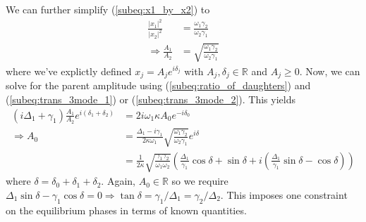We can further simplify (\ref{subeq:x1_by_x2}) to
\begin{subequations}
\begin{align}
\frac{|x_1|^2}{|x_2|^2} & = \frac{\omega_1\gamma_2}{\omega_2\gamma_1} \\
\Rightarrow \frac{A_1}{A_2} & = \sqrt{\frac{\omega_1\gamma_2}{\omega_2\gamma_1}} \label{subeq:ratio_of_daughters}
\end{align}
\end{subequations}
where we've explictly defined $x_j = A_j e^{i\delta_j}$ with $A_j, \delta_j \in \mathbb{R}$ and $A_j \geq 0$. Now, we can solve for the parent amplitude using (\ref{subeq:ratio_of_daughters}) and (\ref{subeq:trans_3mode_1}) or (\ref{subeq:trans_3mode_2}). This yields
\begin{subequations}
\begin{align}
(i\Delta_1+\gamma_1)\frac{A_1}{A_2}e^{i(\delta_1+\delta_2)}  & = 2i\omega_1\kappa A_0 e^{-i\delta_0} \\
\Rightarrow A_0 & = \frac{\Delta_1 - i\gamma_1}{2\kappa\omega_1}\sqrt{\frac{\omega_1\gamma_2}{\omega_2\gamma_1}} e^{i\delta} \\ 
                & = \frac{1}{2\kappa}\sqrt{\frac{\gamma_1\gamma_2}{\omega_1\omega_2}}\left(\frac{\Delta_1}{\gamma_1}\cos{\delta} + \sin{\delta} + i\left(\frac{\Delta_1}{\gamma_1}\sin{\delta} - \cos{\delta}\right)\right)
\end{align}
\end{subequations}
where $\delta = \delta_0 + \delta_1 + \delta_2$. Again, $A_0 \in \mathbb{R}$ so we require $\Delta_1\sin{\delta} - \gamma_1\cos{\delta} = 0 \Rightarrow \tan{\delta} = \gamma_1/\Delta_1 = \gamma_2/\Delta_2$. This imposes one constraint on the equilibrium phases in terms of known quantities.

